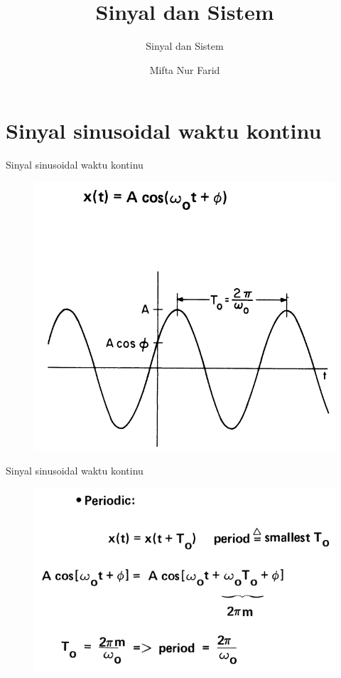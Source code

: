 \documentclass[pdflatex,compress,mathserif]{beamer}
\title{Sinyal dan Sistem}
\subtitle{Sinyal dan Sistem}
\author{Mifta Nur Farid}
\begin{document}
\maketitle

\section{Sinyal sinusoidal waktu kontinu}
\begin{frame}{Sinyal sinusoidal waktu kontinu}
	\begin{figure}
		\centering
		\includegraphics[height=0.8\textheight]{img/01.slide_01}
	\end{figure}
\end{frame}

\begin{frame}{Sinyal sinusoidal waktu kontinu}
	\begin{figure}
		\centering
		\includegraphics[height=0.7\textheight]{img/01.slide_02_01}
	\end{figure}
\end{frame}
\end{document}
